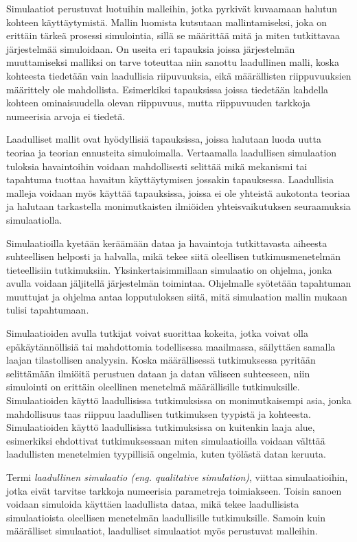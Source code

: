 \documentclass[utf8]{gradu3}
\begin{document}
Simulaatiot perustuvat luotuihin malleihin, 
jotka pyrkivät kuvaamaan halutun kohteen käyttäytymistä. 
Mallin luomista kutsutaan mallintamiseksi, joka on erittäin tärkeä prosessi simulointia,
sillä se määrittää mitä ja miten tutkittavaa järjestelmää simuloidaan. 
On useita eri tapauksia joissa järjestelmän muuttamiseksi malliksi 
on tarve toteuttaa niin sanottu laadullinen malli, koska kohteesta tiedetään vain laadullisia riipuvuuksia, eikä määrällisten riippuvuuksien määrittely ole mahdollista.
Esimerkiksi tapauksissa joissa tiedetään kahdella 
kohteen ominaisuudella olevan riippuvuus, 
mutta riippuvuuden tarkkoja numeerisia arvoja ei tiedetä.

Laadulliset mallit ovat hyödyllisiä tapauksissa, joissa halutaan luoda uutta teoriaa ja teorian ennusteita simuloimalla. Vertaamalla laadullisen simulaation tuloksia havaintoihin 
voidaan mahdollisesti selittää mikä mekanismi tai tapahtuma tuottaa havaitun käyttäytymisen jossakin tapauksessa.
Laadullisia malleja voidaan myös käyttää tapauksissa, joissa ei ole yhteistä aukotonta teoriaa ja halutaan tarkastella monimutkaisten ilmiöiden yhteisvaikutuksen seuraamuksia simulaatiolla.

Simulaatioilla kyetään keräämään dataa ja havaintoja tutkittavasta aiheesta suhteellisen helposti ja halvalla, mikä tekee siitä oleellisen tutkimusmenetelmän tieteellisiin tutkimuksiin. Yksinkertaisimmillaan simulaatio on ohjelma, jonka avulla voidaan jäljitellä järjestelmän toimintaa. Ohjelmalle syötetään tapahtuman muuttujat ja ohjelma antaa lopputuloksen siitä, mitä simulaation mallin mukaan tulisi tapahtumaan. 

Simulaatioiden avulla tutkijat voivat suorittaa kokeita, jotka voivat olla epäkäytännöllisiä tai mahdottomia todellisessa maailmassa, säilyttäen samalla laajan tilastollisen analyysin. Koska määrällisessä tutkimuksessa pyritään selittämään ilmiöitä perustuen dataan ja datan väliseen suhteeseen, niin  simulointi on erittäin oleellinen menetelmä määrällisille tutkimuksille. 
Simulaatioiden käyttö laadullisissa tutkimuksissa on monimutkaisempi asia, 
jonka mahdollisuus taas riippuu laadullisen tutkimuksen tyypistä ja kohteesta. 
Simulaatioiden käyttö laadullisissa tutkimuksissa on kuitenkin laaja alue, 
esimerkiksi \textcite{eldabi2002quantitative} ehdottivat tutkimuksessaan miten simulaatioilla voidaan välttää laadullisten menetelmien tyypillisiä ongelmia, kuten työlästä datan keruuta. 

Termi \textit{laadullinen simulaatio (eng. qualitative simulation)},
viittaa simulaatioihin, 
jotka eivät tarvitse tarkkoja numeerisia parametreja toimiakseen. 
Toisin sanoen voidaan simuloida käyttäen laadullista dataa, mikä tekee 
laadullisista simulaatioista oleellisen menetelmän laadullisille tutkimuksille. 
Samoin kuin määrälliset simulaatiot, laadulliset simulaatiot myös perustuvat malleihin.
\end{document}
